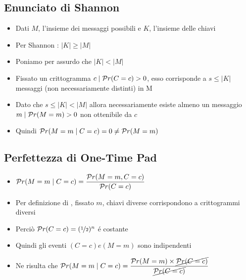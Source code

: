 \subsection{Enunciato di Shannon}

\begin{itemize}
    \item Dati $M$, l'insieme dei messaggi possibili e $K$, l'insieme delle chiavi
    \item Per Shannon : $|K| \geq |M|$
    \item Poniamo per assurdo che $|K| < |M|$
    \item Fissato un crittogramma $c \mid \mathcal{P}r(C = c) > 0$, esso corrisponde a $s \leq |K|$ messaggi (non necessariamente distinti) in M
    \item Dato che $s \leq |K| < |M|$ allora necessariamente esiste almeno un messaggio $m \mid \mathcal{P}r(M=m)>0$ non ottenibile da $c$
    \item Quindi $\mathcal{P}r(M=m \mid C=c) = 0 \not= \mathcal{P}r(M=m)$
\end{itemize}

\subsection{Perfettezza di One-Time Pad}

\begin{itemize}
    \item $\mathcal{P}r(M=m \mid C=c) = \dfrac{\mathcal{P}r(M=m,C=c)}{\mathcal{P}r(C=c)}$
    \item Per definizione di , fissato $m$, chiavi diverse corrispondono a crittogrammi diversi
    \item Perci\`o $\mathcal{P}r(C = c) = (\nicefrac{1}{2})^n$ \'e costante
    \item Quindi gli eventi $(C=c) e (M=m)$ sono indipendenti
    \item Ne risulta che $\mathcal{P}r(M=m \mid C=c) = \dfrac{\mathcal{P}r(M=m) \times \cancel{\mathcal{P}r(C=c)}}{\cancel{\mathcal{P}r(C=c)}}$
\end{itemize}